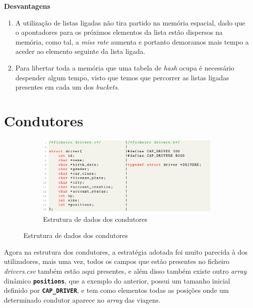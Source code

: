 \documentclass[12pt,a4paper]{report}
\begin{document}
\normalsize\textbf{Desvantagens}
    \begin{enumerate}
        \item A utilização de listas ligadas não tira partido na memória espacial, dado que o apontadores para os próximos elementos da lista estão dispersos na memória, como tal, a \textit{miss rate} aumenta e portanto demoramos mais tempo a aceder ao elemento seguinte da lista ligada.
        
        \item Para libertar toda a memória que uma tabela de \textit{hash} ocupa é necessário despender algum tempo, visto que temos que percorrer as listas ligadas presentes em cada um dos \textit{buckets}.
    \end{enumerate}

\pagebreak
\section{Condutores}

\begin{figure}[hbt!]
    \centering
    \begin{subfigure}{\textwidth}
        \centering
        \includegraphics[width=1\linewidth]{images/drivers.png}
        \caption*{Estrutura de dados dos condutores}
        \label{fig:drivers}
    \end{subfigure}
\end{figure}

Agora na estrutura dos condutores, a estratégia adotada foi muito parecida à dos utilizadores, mais uma vez, todos os campos que estão presentes no ficheiro \textit{drivers.csv} também estão aqui presentes, e além disso também existe outro \textit{array} dinâmico \textbf{\small\texttt{positions}}, que a exemplo do anterior, possui um tamanho inicial definido por \textbf{\small\texttt{CAP\_DRIVER}}, e tem como elementos todas as posições onde um determinado condutor aparece no \textit{array} das viagens.
\end{document}
